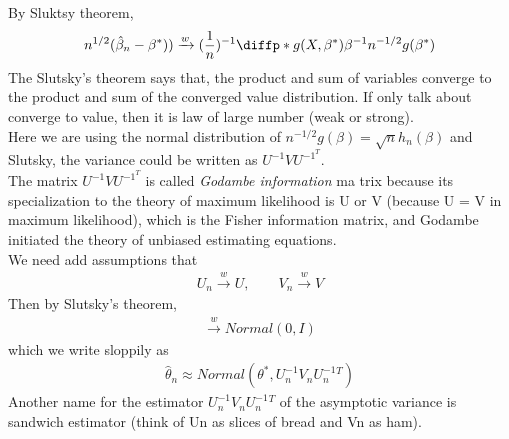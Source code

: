 \documentclass{article}
\begin{document}
By Sluktsy theorem, 
\begin{align*}
   n^{1/2} (\hat{\beta}_n - \beta^{\ast}) ) \xrightarrow{w} (\frac{1}{n})^{-1} \diffp*{ g(X, \beta^{\ast})}{\beta}{}^{-1} n^{-1/2}g(\beta^{\ast})
\end{align*} 
The Slutsky's theorem says that, the product and sum of variables converge to the product and sum of the converged value distribution. If only talk about converge to value, then it is law of large number (weak or strong).\\
Here we are using the normal distribution of $n^{-1/2} g(\beta) = \sqrt{n} h_n(\beta)$ and Slutsky, the variance could be written as $U^{-1}VU^{-1}^T$. \\
The matrix $U^{-1}VU^{-1}^T$ is called \textit{Godambe information} ma trix because its specialization to the theory of maximum likelihood is U or V (because U = V in maximum likelihood), which is the Fisher information
matrix, and Godambe initiated the theory of unbiased estimating equations. \\

We need add assumptions that 
\begin{align*}
  U_n \xrightarrow{w} U, \qquad V_n \xrightarrow{w} V
\end{align*} 
Then by Slutsky's theorem, 
\begin{align*}
  [U_n^{-1} V_n U_n^{-1}^T] [n^{1/2} (\hat{\theta}_n - \theta^{\ast})] \xrightarrow{w} Normal (0,I)
\end{align*} 
which we write sloppily as
\begin{align*}
  \hat{\theta}_n \approx Normal (\theta^{\ast}, U_n^{-1} V_n U_n^{-1}^T)
\end{align*} 
Another name for the estimator $U_n^{-1} V_n U_n^{-1}^T$  of the asymptotic variance is sandwich estimator (think of Un as slices of bread and Vn as ham).\\
\end{document}
